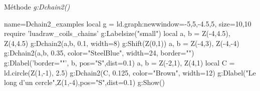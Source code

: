 \begin{itemize}
\begin{demo}{Méthode \emph{g:Dchain2()}}
\begin{luadraw}{name=Dchain2_examples}
local g = ld.graph:new{window={-5,5,-4.5,5}, size={10,10}}
require 'luadraw_coils_chains'
g:Labelsize("small")
local a, b = Z(-4,4.5), Z(4,4.5)
g:Dchain2({a,b}, 0.1, {width=8})
g:Shift(Z(0,1))
a, b = Z(-4,3), Z(-4,-4)
g:Dchain2({a,b}, 0.35, {color="SteelBlue", width=24, border=""})
g:Dlabel('border=""', b, {pos="S",dist=0.1})
a, b = Z(-2,1), Z(4,1)
local C = ld.circle(Z(1,-1), 2.5)
g:Dchain2(C, 0.125, {color="Brown", width=12})
g:Dlabel("Le long d'un cercle",Z(1,-4),{pos="S",dist=0.1})
g:Show()
\end{luadraw} 
\end{demo}
\end{itemize}
